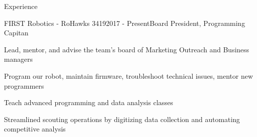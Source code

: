 \documentclass{resume}
\begin{document}
\begin{rSection}{Experience}

    \begin{rSubsection}{FIRST Robotics - RoHawks 3419}{2017 - Present}{Board President, Programming Capitan}{}
        \item Lead, mentor, and advise the team's board of Marketing Outreach and Business managers
        \item Program our robot, maintain firmware, troubleshoot technical issues, mentor new programmers
        \item Teach advanced programming and data analysis classes
        \item Streamlined scouting operations by digitizing data collection and automating competitive analysis
    \end{rSubsection}
\end{rSection}




\end{document}
